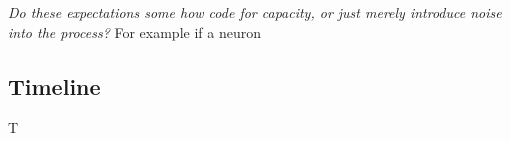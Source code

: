 \documentclass[12pt]{article}
\newif\ifdraft
\begin{document}
\begin{itemize}
    	   \emph{Do these expectations some how code for capacity, or just merely introduce noise into the process?} For example if a neuron
	   
	   
	   


\end{itemize}

\subsection{Timeline}

T






% 
% 
% 
% 
% 
% 
% 

\ifdraft
\appendix
% 
\fi




\end{document}
